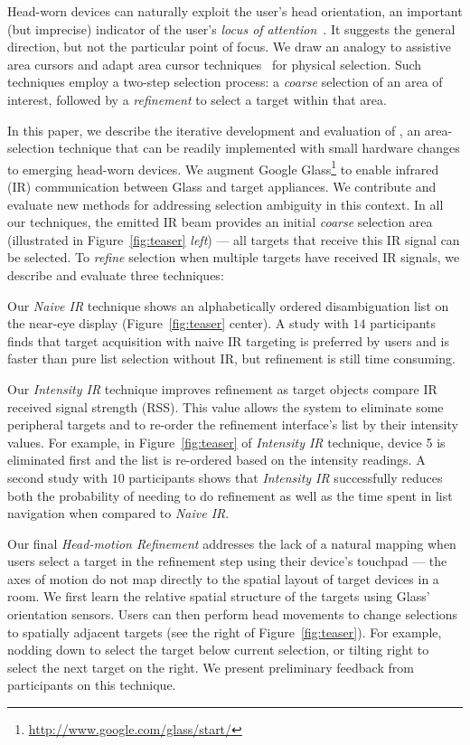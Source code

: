 Head-worn devices can naturally exploit the user's head orientation, an important (but imprecise) indicator of the user's {\em locus of attention}~\cite{raskin}. It suggests the general direction, but not the particular point of focus. We draw an analogy to assistive area cursors and adapt area cursor techniques~\cite{kabbash1995prince,worden1997making,findlater2010enhanced} for physical selection. Such techniques employ a two-step selection process: a {\em coarse} selection of an area of interest, followed by a {\em refinement} to select a target within that area.

In this paper, we describe the iterative development and evaluation of \systemnamenospace, an area-selection technique that can be readily implemented with small hardware changes to emerging head-worn devices. We augment Google Glass\footnote{\url{http://www.google.com/glass/start/}} to enable infrared (IR) communication between Glass and target appliances. We contribute and evaluate new methods for addressing selection ambiguity in this context. In all our techniques, the emitted IR beam %
 provides an initial {\em coarse} selection area (illustrated in Figure~\ref{fig:teaser} {\em left}) --- all targets that receive this IR signal can be selected. To {\em refine} selection when multiple targets have received IR signals, we describe and evaluate three techniques:

 Our {\em Naive IR} technique shows an alphabetically ordered disambiguation list on the near-eye display (Figure~\ref{fig:teaser} center). A study with $14$ participants finds that target acquisition with naive IR targeting is preferred by users and is faster than pure list selection without IR, but refinement is still time consuming.

Our {\em Intensity IR} technique improves refinement as target objects compare IR received signal strength (RSS). This value allows the system to eliminate some peripheral targets and to re-order the refinement interface's list by their intensity values. For example, in Figure~\ref{fig:teaser} of {\em Intensity IR} technique, device 5 is eliminated first and the list is re-ordered based on the intensity readings. A second study with $10$ participants shows that {\em Intensity IR} successfully reduces both the probability of needing to do refinement as well as the time spent in list navigation when compared to {\em Naive IR}.

Our final {\em Head-motion Refinement} addresses the lack of a natural mapping when users select a target in the refinement step using their device's touchpad --- the axes of motion do not map directly to the spatial layout of target devices in a room. We first learn the relative spatial structure of the targets using Glass' orientation sensors. Users can then perform head movements to change selections to spatially adjacent targets (see the right of Figure~\ref{fig:teaser}). For example, nodding down to select the target below current selection, or tilting right to select the next target on the right. We present preliminary feedback from participants on this technique.

